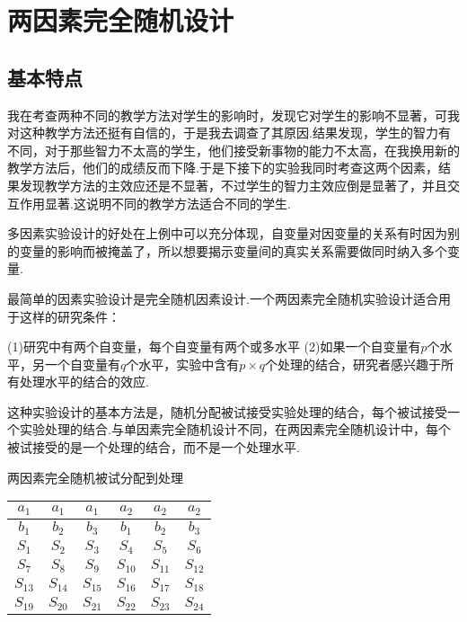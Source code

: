 \section{两因素完全随机设计}

\subsection{基本特点}
我在考查两种不同的教学方法对学生的影响时，发现它对学生的影响不显著，可我对这种教学方法还挺有自信的，于是我去调查了其原因.结果发现，学生的智力有不同，对于那些智力不太高的学生，他们接受新事物的能力不太高，在我换用新的教学方法后，他们的成绩反而下降.于是下接下的实验我同时考查这两个因素，结果发现教学方法的主效应还是不显著，不过学生的智力主效应倒是显著了，并且交互作用显著.这说明不同的教学方法适合不同的学生.

多因素实验设计的好处在上例中可以充分体现，自变量对因变量的关系有时因为别的变量的影响而被掩盖了，所以想要揭示变量间的真实关系需要做同时纳入多个变量.

最简单的因素实验设计是完全随机因素设计.一个两因素完全随机实验设计适合用于这样的研究条件：

(1)研究中有两个自变量，每个自变量有两个或多水平
(2)如果一个自变量有$p$个水平，另一个自变量有$q$个水平，实验中含有$p \times q$个处理的结合，研究者感兴趣于所有处理水平的结合的效应.

这种实验设计的基本方法是，随机分配被试接受实验处理的结合，每个被试接受一个实验处理的结合.与单因素完全随机设计不同，在两因素完全随机设计中，每个被试接受的是一个处理的结合，而不是一个处理水平.

\begin{margintable}
    \centering
    \caption{两因素完全随机被试分配到处理}
    \begin{tabular}{cccccc}
    \toprule
        $a_1$ & $a_1$ & $a_1$ & $a_2$ & $a_2$ & $a_2$ \\
    \midrule
        $b_1$ & $b_2$ & $b_3$ & $b_1$ & $b_2$ & $b_3$ \\
        $S_1$ & $S_2$ & $S_3$ & $S_4$ & $S_5$ & $S_6$ \\
        $S_7$ & $S_8$ & $S_9$ & $S_{10}$ & $S_{11}$ & $S_{12}$ \\
        $S_{13}$ & $S_{14}$ & $S_{15}$ & $S_{16}$ & $S_{17}$ & $S_{18}$ \\
        $S_{19}$ & $S_{20}$ & $S_{21}$ & $S_{22}$ & $S_{23}$ & $S_{24}$ \\
    \bottomrule    
    \end{tabular}
\end{margintable}

